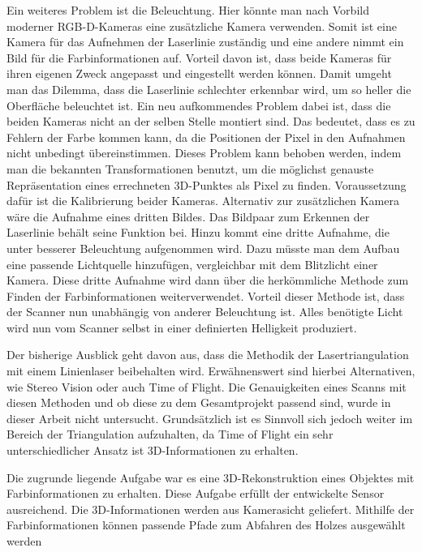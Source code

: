 	Ein weiteres Problem ist die Beleuchtung. Hier könnte man nach Vorbild moderner RGB-D-Kameras eine zusätzliche Kamera verwenden. Somit ist eine Kamera für das Aufnehmen der Laserlinie zuständig und eine andere nimmt ein Bild für die Farbinformationen auf. Vorteil davon ist, dass beide Kameras für ihren eigenen Zweck angepasst und eingestellt werden können. Damit umgeht man das Dilemma, dass die Laserlinie schlechter erkennbar wird, um so heller die Oberfläche beleuchtet ist. Ein neu aufkommendes Problem dabei ist, dass die beiden Kameras nicht an der selben Stelle montiert sind. Das bedeutet, dass es zu Fehlern der Farbe kommen kann, da die Positionen der Pixel in den Aufnahmen nicht unbedingt übereinstimmen. Dieses Problem kann behoben werden, indem man die bekannten Transformationen benutzt, um die möglichst genauste Repräsentation eines errechneten 3D-Punktes als Pixel zu finden. Voraussetzung dafür ist die Kalibrierung beider Kameras. Alternativ zur zusätzlichen Kamera wäre die Aufnahme eines dritten Bildes. Das Bildpaar zum Erkennen der Laserlinie behält seine Funktion bei. Hinzu kommt eine dritte Aufnahme, die unter besserer Beleuchtung aufgenommen wird. Dazu müsste man dem Aufbau eine passende Lichtquelle hinzufügen, vergleichbar mit dem Blitzlicht einer Kamera. Diese dritte Aufnahme wird dann über die herkömmliche Methode zum Finden der Farbinformationen weiterverwendet. Vorteil dieser Methode ist, dass der Scanner nun unabhängig von anderer Beleuchtung ist. Alles benötigte Licht wird nun vom Scanner selbst in einer definierten Helligkeit produziert.
	
	Der bisherige Ausblick geht davon aus, dass die Methodik der Lasertriangulation mit einem Linienlaser beibehalten wird. Erwähnenswert sind hierbei Alternativen, wie Stereo Vision oder auch Time of Flight. Die Genauigkeiten eines Scanns mit diesen Methoden und ob diese zu dem Gesamtprojekt passend sind, wurde in dieser Arbeit nicht untersucht. Grundsätzlich ist es Sinnvoll sich jedoch weiter im Bereich der Triangulation aufzuhalten, da Time of Flight ein sehr unterschiedlicher Ansatz ist 3D-Informationen zu erhalten.
	
	Die zugrunde liegende Aufgabe war es eine 3D-Rekonstruktion eines Objektes mit Farbinformationen zu erhalten. Diese Aufgabe erfüllt der entwickelte Sensor ausreichend. Die 3D-Informationen werden aus Kamerasicht geliefert. Mithilfe der Farbinformationen können passende Pfade zum Abfahren des Holzes ausgewählt werden